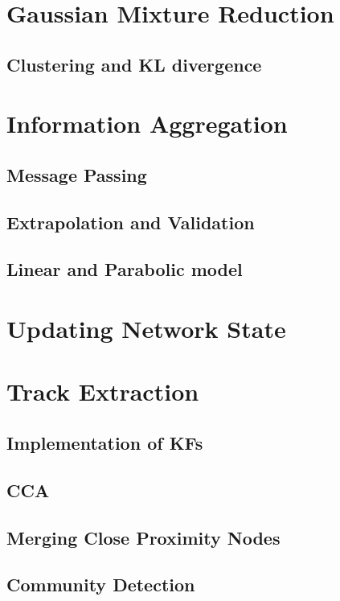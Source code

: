 \section{Gaussian Mixture Reduction}
\subsection{Clustering and KL divergence}

\section{Information Aggregation}
\subsection{Message Passing}
\subsection{Extrapolation and Validation}
\subsection{Linear and Parabolic model}

\section{Updating Network State}

\section{Track Extraction}
\subsection{Implementation of KFs}
\subsection{CCA}
\subsection{Merging Close Proximity Nodes}
\subsection{Community Detection}


